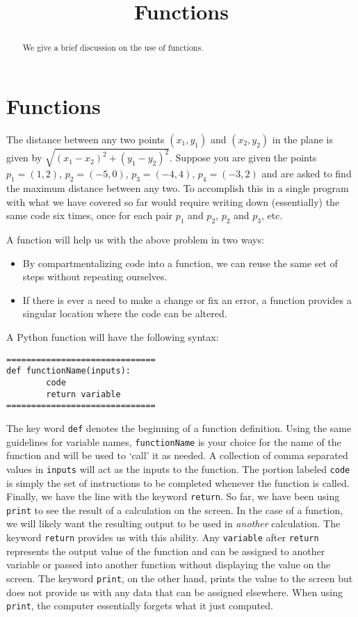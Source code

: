 \documentclass{ximera}
\title{Functions}
\begin{document}
  
\begin{abstract}  
We give a brief discussion on the use of functions.
\end{abstract}  
\maketitle

\section{Functions}

The distance between any two points $(x_1,y_1)$ and $(x_2,y_2)$ in the plane is given by $\sqrt{(x_1-x_2)^2+(y_1-y_2)^2}.$ Suppose you are given the points $p_1=(1,2)$, $p_2=(-5,0)$, $p_3=(-4,4)$, $p_4=(-3,2)$ and are asked to find the maximum distance between any two. To accomplish this in a single program with what we have covered so far would require writing down (essentially) the same code six times, once for each pair $p_1$ and $p_2$, $p_2$ and $p_3$, etc. 

A function will help us with the above problem in two ways:

\begin{itemize}
	\item By compartmentalizing code into a function, we can reuse the same set of steps without repeating ourselves.
	\item If there is ever a need to make a change or fix an error, a function provides a singular location where the code can be altered.
\end{itemize}

A Python function will have the following syntax:

\begin{verbatim}
==============================
def functionName(inputs):
        code
        return variable
==============================
\end{verbatim}

The key word \verb|def| denotes the beginning of a function definition. Using the same guidelines for variable names, \verb|functionName| is your choice for the name of the function and will be used to `call' it as needed. A collection of comma separated values in \verb|inputs| will act as the inputs to the function.  The portion labeled \verb|code| is simply the set of instructions to be completed whenever the function is called. Finally, we have the line with the keyword \verb|return|. So far, we have been using \verb|print| to see the result of a calculation on the screen. In the case of a function, we will likely want the resulting output to be used in {\em another} calculation. The keyword \verb|return| provides us with this ability. Any \verb|variable| after \verb|return| represents the output value of the function and can be assigned to another variable or passed into another function without displaying the value on the screen. The keyword \verb|print|, on the other hand, prints the value to the screen but does not provide us with any data that can be assigned elsewhere. When using \verb|print|, the computer essentially forgets what it just computed.
\end{document}
